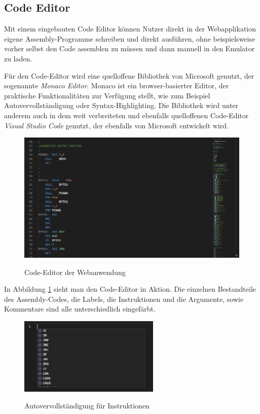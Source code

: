 \subsection{Code Editor}

Mit einem eingebauten Code Editor können Nutzer direkt in der Webapplikation eigene Assembly-Programme schreiben und direkt ausführen, ohne beispielsweise vorher selbst den Code assemblen zu müssen und dann manuell in den Emulator zu laden.

Für den Code-Editor wird eine quelloffene Bibliothek von Microsoft genutzt, der sogenannte \textit{Monaco Editor}. Monaco ist ein browser-basierter Editor, der praktische Funktionalitäten zur Verfügung stellt, wie zum Beispiel Autovervollständigung oder Syntax-Highlighting. Die Bibliothek wird unter anderem auch in dem weit verbreiteten und ebenfalls quelloffenen Code-Editor \textit{Visual Studio Code} genutzt, der ebenfalls von Microsoft entwickelt wird.

\begin{figure}
    \caption{Code-Editor der Webanwendung}
    \centering
    \includegraphics[width=1.0\textwidth]{Bilder/CodeEditor.png}
    \label{fig:codeeditor}
\end{figure}

In Abbildung \ref{fig:codeeditor} sieht man den Code-Editor in Aktion. Die einzelnen Bestandteile des Assembly-Codes, die Labels, die Instruktionen und die Argumente, sowie Kommentare sind alle unterschiedlich eingefärbt.

\begin{figure}
    \caption{Autovervollständigung für Instruktionen}
    \centering
    \includegraphics[width=0.6\textwidth]{Bilder/Completion_1.png}
    \label{fig:completion1}
\end{figure}

